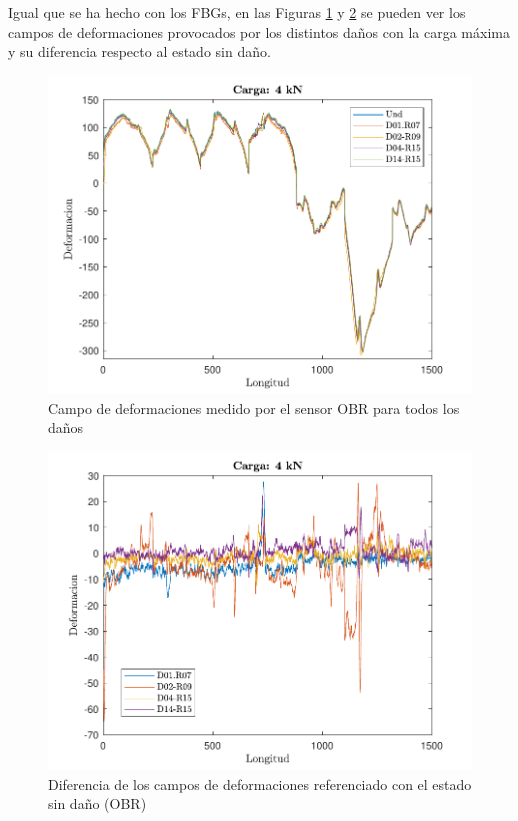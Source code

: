 Igual que se ha hecho con los FBGs, en las Figuras \ref{OBRR_dam} y \ref{OBRR_dif} se pueden ver los campos de deformaciones provocados por los distintos daños con la carga máxima y su diferencia respecto al estado sin daño.

\begin{figure}[h!]
    \centering
    \includegraphics[width=125mm, angle=0]{3/Fotos/OBR_damages.pdf}
    \captionsetup{justification=centering,margin=1.25cm}
    \caption{Campo de deformaciones medido por el sensor OBR para todos los daños}
    \label{OBRR_dam}
\end{figure}
    
\begin{figure}[h!]
    \centering
    \includegraphics[width=125mm, angle=0]{3/Fotos/OBR_dif.pdf}
    \captionsetup{justification=centering,margin=1.25cm}
    \caption{Diferencia de los campos de deformaciones referenciado con el estado sin daño (OBR)}
    \label{OBRR_dif}
\end{figure}


